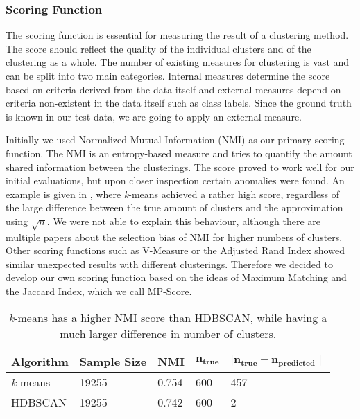 \subsubsection{Scoring Function}
\label{subsubsec:4b_scoring_function}

The scoring function is essential for measuring the result of a clustering method.
The score should reflect the quality of the individual clusters and of the clustering as a whole.
The number of existing measures for clustering is vast and can be split into two main categories.
Internal measures determine the score based on criteria derived from the data itself
and external measures depend on criteria non-existent in the data itself such as class labels.
Since the ground truth is known in our test data, we are going to apply an external measure.

Initially we used Normalized Mutual Information (NMI) as our primary scoring function.
The NMI is an entropy-based measure and tries to quantify the amount shared information between the clusterings.
The score proved to work well for our initial evaluations, but upon closer inspection certain anomalies were found.
An example is given in , where \textit{k}-means achieved a rather high score,
regardless of the large difference between the true amount of clusters and the approximation using $\sqrt{n}$.
We were not able to explain this behaviour, although there are multiple papers
about the selection bias of NMI for higher numbers of clusters\cite{LEI201758, clustering_anmi}.
Other scoring functions such as V-Measure or the Adjusted Rand Index
showed similar unexpected results with different clusterings.
Therefore we decided to develop our own scoring function based on the ideas of Maximum Matching\cite{data_mining}
and the Jaccard Index, which we call MP-Score.

\begin{table}[h]
    \centering
    \begin{tabular}{|l|l|l|l|l|}
    \hline
    \textbf{Algorithm} & \textbf{Sample Size} & \textbf{NMI}  & $\mathbf{n_{true}}$ & $\mathbf{ \mid n_{true} - n_{predicted} \mid }$ \\ \hline
    \textit{k}-means & 19255 & 0.754 & 600 & 457 \\ \hline
    HDBSCAN & 19255 & 0.742 & 600 & 2 \\ \hline
    \end{tabular}
    \caption{
        \textit{k}-means has a higher NMI score than HDBSCAN,
        while having a much larger difference in number of clusters.
    }
    \label{tab:nmi_kmeans_example}
\end{table}

